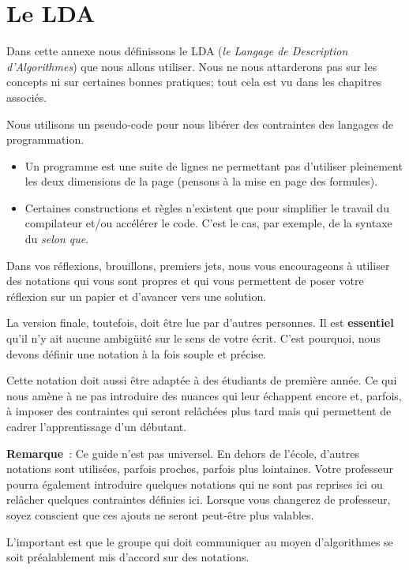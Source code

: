 \chapter{Le LDA}

	Dans cette annexe nous définissons le LDA
	(\emph{le Langage de Description d’Algorithmes})
	que nous allons utiliser. 
	Nous ne nous attarderons pas sur les concepts
	ni sur certaines bonnes pratiques;
	tout cela est vu dans les chapitres associés.
	
	Nous utilisons un pseudo-code pour nous libérer 
	des contraintes des langages de programmation.
	\begin{itemize}
	\item
		Un programme est une suite de lignes
		ne permettant pas d’utiliser pleinement les
		deux dimensions de la page 
		(pensons à la mise en page des formules).
	\item
		Certaines constructions et règles
		n’existent que pour simplifier le travail du compilateur
		et/ou accélérer le code.
		C’est le cas, par exemple, de la syntaxe du \emph{selon que}.
	\end{itemize}
	
	Dans vos réflexions, brouillons, premiers jets,
	nous vous encourageons à utiliser des notations
	qui vous sont propres et qui vous permettent
	de poser votre réflexion sur un papier
	et d’avancer vers une solution.
	
	La version finale, toutefois, 
	doit être lue par d’autres personnes.
	Il est \textbf{essentiel} qu’il n’y ait aucune ambigüité
	sur le sens de votre écrit.
	C’est pourquoi, nous devons définir une notation
	à la fois souple et précise.
	
	Cette notation doit aussi être adaptée à des étudiants de première année.
	Ce qui nous amène à ne pas introduire des nuances qui leur échappent encore
	et, parfois, à imposer des contraintes qui seront relâchées plus tard
	mais qui permettent de cadrer l’apprentissage d’un débutant.
	
	\textbf{Remarque}~: Ce guide n’est pas universel.
	En dehors de l’école, d’autres notations sont utilisées,
	parfois proches, parfois plus lointaines.
	Votre professeur pourra également introduire quelques notations
	qui ne sont pas reprises ici 
	ou relâcher quelques contraintes définies ici. 
	Lorsque vous changerez de professeur,
	soyez conscient que ces ajouts ne seront peut-être plus valables.
	
	L’important est que le groupe qui doit communiquer
	au moyen d’algorithmes se soit préalablement mis d’accord 
	sur des notations.

